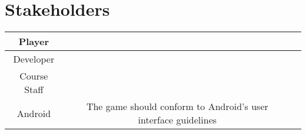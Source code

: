 \section{Stakeholders} 
\label{sec:stakeholders}

\begin{tabular}{|c|c|c|}
\hline
Player & \\ \hline %
Developer & \\ \hline %
Course Staff &  \\ \hline %
Android & The game should conform to Android's user interface guidelines \cite{website:Android} %
\end{tabular}

